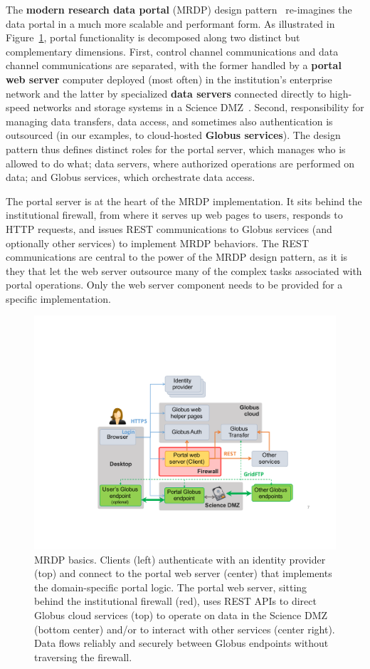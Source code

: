\documentclass[10pt]{article}
\begin{document}
The \textbf{modern research data portal} (MRDP) design pattern~\cite{BMRDP}
re-imagines the data portal in a much more scalable and performant form.
As illustrated in Figure~\ref{fig:simple},
portal functionality is decomposed along two distinct but complementary dimensions.
First, control channel communications and data channel communications are separated,
with the former handled by a \textbf{portal web server} computer deployed (most often) in the institution's enterprise network
and the latter by specialized \textbf{data servers} connected directly to high-speed networks
and storage systems in a Science DMZ~\cite{dart2014science}.
Second, responsibility for managing data transfers, data access, and sometimes also authentication is
outsourced (in our examples, to cloud-hosted \textbf{Globus services}).
The design pattern thus defines distinct roles for the portal server, 
which manages who is allowed to do what;
data servers, where authorized operations are performed on data;
and Globus services, which orchestrate data access. 

The portal server is at the heart of the MRDP implementation. 
It sits behind the institutional firewall, from where it serves up web pages to users, 
responds to HTTP requests, 
and issues REST communications to Globus services (and optionally other services) to implement MRDP behaviors. 
The REST communications are central to the power of the MRDP design pattern, 
as it is they that let the web server outsource many of the complex tasks associated with portal operations. 
Only the web server component needs to be provided for a specific implementation.


\begin{figure}
\vspace{-6ex}
    \centering
    \includegraphics[trim=2.3in 1.2in 1.5in 2.1in,clip,width=0.5\columnwidth]{Figures/ResearchDataPortal-new.pdf}
    \caption{MRDP basics. Clients (left) authenticate with 
    an identity provider (top) and connect to the portal web server (center) that implements the domain-specific portal logic.
    The portal web server, sitting behind the institutional firewall (red),
    uses REST APIs
    to direct Globus cloud services (top) to operate on data in the Science DMZ (bottom center) and/or to interact with other services (center right).
    Data flows reliably and securely between Globus endpoints without traversing the firewall.
    \label{fig:simple}}
\end{figure}
\end{document}
